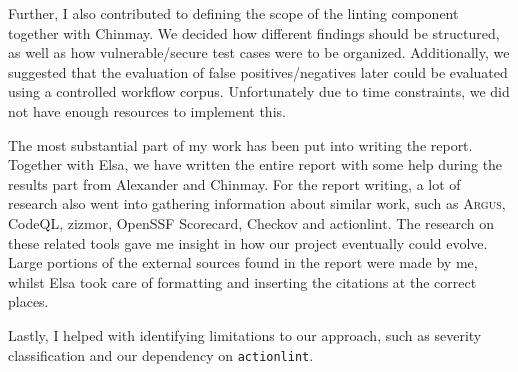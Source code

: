 \documentclass{article}
\begin{document}
Further, I also contributed to defining the scope of the linting component together with Chinmay. We decided how different findings should be structured, as well as how vulnerable/secure test cases were to be organized. Additionally, we suggested that the evaluation of false positives/negatives later could be evaluated using a controlled workflow corpus. Unfortunately due to time constraints, we did not have enough resources to implement this. 

The most substantial part of my work has been put into writing the report. Together with Elsa, we have written the entire report with some help during the results part from Alexander and Chinmay. For the report writing, a lot of research also went into gathering information about similar work, such as \textsc{Argus}, CodeQL, zizmor, OpenSSF Scorecard, Checkov and actionlint. The research on these related tools gave me insight in how our project eventually could evolve. Large portions of the external sources found in the report were made by me, whilst Elsa took care of formatting and inserting the citations at the correct places. 

Lastly, I helped with identifying limitations to our approach, such as severity classification and our dependency on \texttt{actionlint}. 



\end{document}
